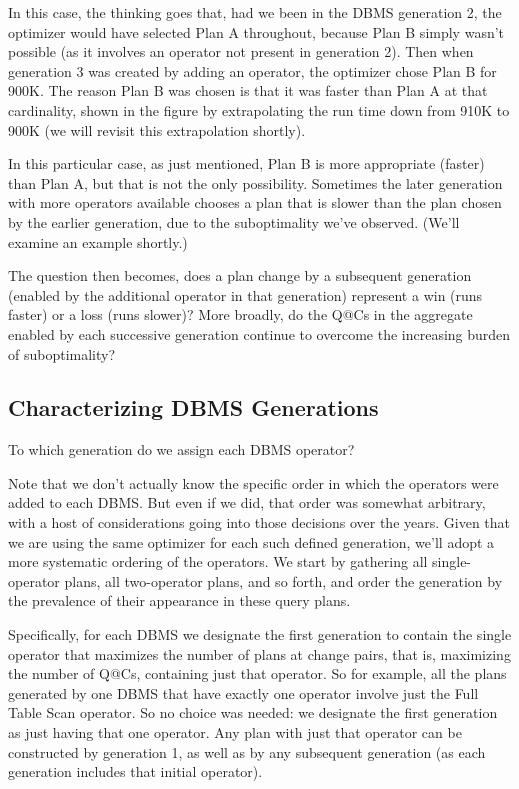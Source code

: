 \documentclass[prodmode,acmtods]{acmsmall}
\begin{document}
In this case, the thinking goes that, had we been
in the \hbox{DBMS} generation 2, the optimizer would have selected Plan A
throughout, because Plan B simply wasn't possible (as it involves an
operator not present in generation 2). Then when generation 3 was created by
adding an operator, the optimizer chose Plan B for 900K. The reason Plan B
was chosen is that it was faster than Plan A at that cardinality, shown in
the figure by extrapolating the run time down from 910K to 900K (we will
revisit this extrapolation shortly).

In this particular case, as just mentioned, Plan B is more appropriate (faster) than Plan A,
but that is not the only possibility. Sometimes the later generation with
more operators available chooses a plan that is slower
than the plan chosen by the earlier generation, due to the suboptimality
we've observed. (We'll examine an example shortly.)

The question then becomes, does a plan change by a subsequent generation
(\hbox{enabled} by the additional operator in that generation) represent a win (runs faster)
or a loss (runs slower)? More broadly, do the Q@Cs
in the aggregate enabled by each successive generation continue to overcome
the increasing burden of suboptimality?

\subsection{Characterizing \hbox{DBMS} Generations}
To which generation do we assign each \hbox{DBMS} operator?

Note that we don't actually know the specific order in which the operators
were added to each \hbox{DBMS}. But even if we did, that order was somewhat
arbitrary, with a host of considerations going into those decisions over the
years. Given that we are using the same optimizer for each such defined
generation, we'll adopt a more systematic ordering of the operators. We
start by gathering all single-operator plans, all two-operator plans,
and so forth, and order the generation by the prevalence of their
\hbox{appearance} in these query plans.

Specifically, for each \hbox{DBMS} we designate the first
generation to contain the single operator that maximizes the number of plans
at change pairs, that is, maximizing the number of Q@Cs, containing just that
operator. So for example, all the plans generated by one DBMS that have exactly
one operator involve just the Full Table Scan operator.  So no choice was
needed: we designate the
first generation as just having that one operator. Any plan with just that
operator can be constructed by generation 1, as well as by any
subsequent generation (as each generation includes that initial operator).
\end{document}
